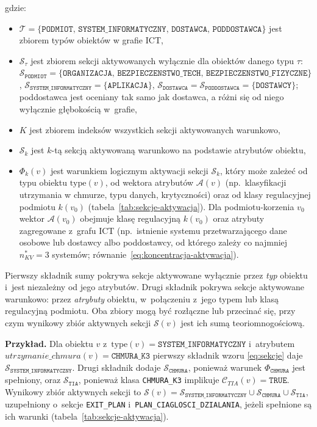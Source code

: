 \noindent gdzie:
\begin{itemize}
  \item $\mathcal{T} = \{\texttt{PODMIOT},\, \texttt{SYSTEM\_INFORMATYCZNY},\, \texttt{DOSTAWCA},\, \texttt{PODDOSTAWCA}\}$
        jest zbiorem typów obiektów w grafie ICT,
  \item $\mathcal{S}_{\tau}$ jest zbiorem sekcji aktywowanych wyłącznie
        dla obiektów danego typu $\tau$:
        $\mathcal{S}_{\texttt{PODMIOT}} = \{\texttt{ORGANIZACJA},\, \texttt{BEZPIECZENSTWO\_TECH},\, \texttt{BEZPIECZENSTWO\_FIZYCZNE}\}$,
        $\mathcal{S}_{\texttt{SYSTEM\_INFORMATYCZNY}} = \{\texttt{APLIKACJA}\}$,
        $\mathcal{S}_{\texttt{DOSTAWCA}} = \mathcal{S}_{\texttt{PODDOSTAWCA}} = \{\texttt{DOSTAWCY}\}$;
        poddostawca jest oceniany tak samo jak dostawca, a różni się od niego
        wyłącznie głębokością w~grafie,
  \item $K$ jest zbiorem indeksów wszystkich sekcji aktywowanych warunkowo,
  \item $\mathcal{S}_k$ jest $k$-tą sekcją aktywowaną warunkowo
        na podstawie atrybutów obiektu,
  \item $\Phi_k(v)$ jest warunkiem logicznym aktywacji sekcji $\mathcal{S}_k$,
        który może zależeć od typu obiektu $\mathrm{type}(v)$, od wektora
        atrybutów $\mathcal{A}(v)$ (np.\ klasyfikacji utrzymania w chmurze,
        typu danych, krytyczności) oraz od klasy regulacyjnej podmiotu $k(v_0)$
        (tabela~\ref{tab:sekcje-aktywacja}).
        Dla podmiotu-korzenia $v_0$ wektor $\mathcal{A}(v_0)$ obejmuje klasę
        regulacyjną $k(v_0)$ oraz atrybuty zagregowane z~grafu ICT
        (np.\ istnienie systemu przetwarzającego dane osobowe
        lub dostawcy albo poddostawcy, od którego zależy co najmniej $n_{KV}^{*} = 3$ systemów; równanie~\eqref{eq:koncentracja-aktywacja}).
\end{itemize}

Pierwszy składnik sumy pokrywa sekcje aktywowane wyłącznie przez \emph{typ} obiektu i~jest niezależny od jego atrybutów. Drugi składnik pokrywa sekcje aktywowane warunkowo: przez \emph{atrybuty} obiektu, w~połączeniu z~jego typem lub klasą regulacyjną podmiotu. Oba zbiory mogą być rozłączne lub przecinać się, przy czym wynikowy zbiór aktywnych sekcji $\mathcal{S}(v)$ jest ich sumą teoriomnogościową.

\noindent\textbf{Przykład.}
Dla obiektu $v$ z~$\mathrm{type}(v) = \texttt{SYSTEM\_INFORMATYCZNY}$
i~atrybutem $\textit{utrzymanie\_chmura}(v) = \texttt{CHMURA\_K3}$
pierwszy składnik wzoru \eqref{eq:sekcje} daje $\mathcal{S}_{\texttt{SYSTEM\_INFORMATYCZNY}}$.
Drugi składnik dodaje $\mathcal{S}_{\texttt{CHMURA}}$, ponieważ warunek $\Phi_{\texttt{CHMURA}}$ jest spełniony, oraz $\mathcal{S}_{\texttt{TIA}}$, ponieważ klasa \texttt{CHMURA\_K3} implikuje $\mathcal{C}_{TIA}(v) = \texttt{TRUE}$.
Wynikowy zbiór aktywnych sekcji to
$\mathcal{S}(v) = \mathcal{S}_{\texttt{SYSTEM\_INFORMATYCZNY}} \cup \mathcal{S}_{\texttt{CHMURA}} \cup \mathcal{S}_{\texttt{TIA}}$,
uzupełniony o~sekcje \texttt{EXIT\_PLAN} i~\texttt{PLAN\_CIAGLOSCI\_DZIALANIA}, jeżeli spełnione są ich warunki (tabela~\ref{tab:sekcje-aktywacja}).

